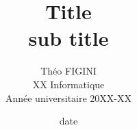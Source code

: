 \documentclass[12pt]{report}
\title{{\huge \bfseries Title}\\[0.2cm]
		{\Large sub title}}
\author{Théo \textsc{FIGINI}\\XX Informatique\\Année universitaire 20XX-XX}
\date{date}
\begin{document}


\renewcommand{\thefigure}{\arabic{figure}}
\setcounter{figure}{0}







\printbibliography
\end{document}

